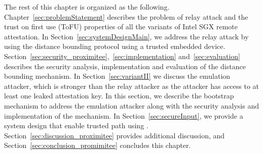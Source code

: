 The rest of this chapter is organized as the following. Chapter~\ref{sec:problemStatement} describes the problem of relay attack and the trust on first use (ToFU) properties of all the variants of Intel SGX remote attestation. In Section~\ref{sec:systemDesignMain}, we address the relay attack by using the distance bounding protocol using a trusted embedded device. Section~\ref{sec:security_proximitee},~\ref{sec:implementation} and~\ref{sec:evaluation} describes the security analysis, implementation and evaluation of the distance bounding mechanism. In Section~\ref{sec:variantII} we discuss the emulation attacker, which is stronger than the relay attacker as the attacker has access to at least one leaked attestation key. In this section, we describe the bootstrap mechanism to address the emulation attacker along with the security analysis and implementation of the mechanism. In Section~\ref{sec:secureInput}, we provide a system design that enable trusted path using \proximitee. Section~\ref{sec:discussion_proximitee} provides additional discussion, and Section~\ref{sec:conclusion_promimitee} concludes this chapter.



